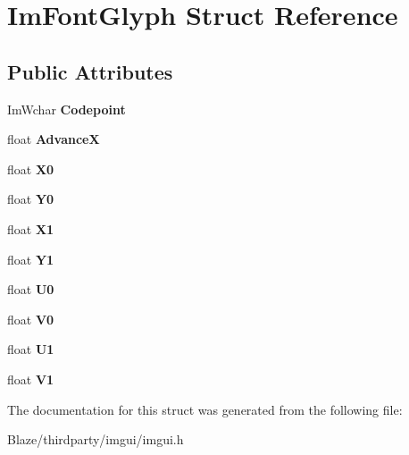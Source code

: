 \hypertarget{structImFontGlyph}{}\section{Im\+Font\+Glyph Struct Reference}
\label{structImFontGlyph}
\subsection*{Public Attributes}
\begin{DoxyCompactItemize}
\item 
\mbox{\label{structImFontGlyph_a3ff56d019068137a3df514caa3961421}} 
Im\+Wchar {\bfseries Codepoint}
\item 
\mbox{\label{structImFontGlyph_a11bfab7bcdb497fe2d649745c7d39b33}} 
float {\bfseries AdvanceX}
\item 
\mbox{\label{structImFontGlyph_a1e93bf7292c052549972fc46646ff104}} 
float {\bfseries X0}
\item 
\mbox{\label{structImFontGlyph_ac1deecd5b352949f30d396a58b68dd09}} 
float {\bfseries Y0}
\item 
\mbox{\label{structImFontGlyph_a1d907170d807c5e5f2a43d74b99f0d89}} 
float {\bfseries X1}
\item 
\mbox{\label{structImFontGlyph_aa6a0440694ae06c4cf03316498327bd2}} 
float {\bfseries Y1}
\item 
\mbox{\label{structImFontGlyph_a3c9d90fb39f6beaf9d69413fa4c8366f}} 
float {\bfseries U0}
\item 
\mbox{\label{structImFontGlyph_a26b7b7b9ee43ab67e98af9ea1131ce20}} 
float {\bfseries V0}
\item 
\mbox{\label{structImFontGlyph_aaca9625f2d6972016e05fed583db85b0}} 
float {\bfseries U1}
\item 
\mbox{\label{structImFontGlyph_a3d28904aad639835cdff3e4416663d7c}} 
float {\bfseries V1}
\end{DoxyCompactItemize}


The documentation for this struct was generated from the following file\+:\begin{DoxyCompactItemize}
\item 
Blaze/thirdparty/imgui/imgui.\+h\end{DoxyCompactItemize}
